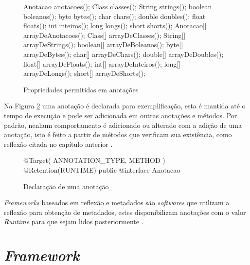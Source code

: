 \begin{figure}[H]
    \centering
    \caption{Propriedades permitidas em anotações}
    \begin{java}
Anotacao anotacoes();
Class classes();
String strings();
boolean boleanos();
byte bytes();
char chars();
double doubles();
float floats();
int inteiros();
long longs();	
short shorts();
Anotacao[] arrayDeAnotacoes();
Class[] arrayDeClasses();
String[] arrayDeStrings();
boolean[] arrayDeBoleanos();
byte[] arrayDeBytes();
char[] arrayDeChars();
double[] arrayDeDoubles();
float[] arrayDeFloats();
int[] arrayDeInteiros();
long[] arrayDeLongs();	
short[] arrayDeShorts();
    \end{java}
    \label{fig:propriedades-anotacoes}
\end{figure}

\par Na Figura \ref{fig:declaracao-anotacao} uma anotação é declarada para exemplificação, esta é mantida até o tempo de execução e pode ser adicionada em outras anotações e métodos. Por padrão, nenhum comportamento é adicionado ou alterado com a adição de uma anotação, isto é feito a partir de métodos que verificam sua existência, como reflexão citada no capítulo anterior \cite{bloch2004jsr}. 

\begin{figure}[H]
    \centering
    \caption{Declaração de uma anotação}
    \begin{java}
@Target({ ANNOTATION_TYPE, METHOD })
@Retention(RUNTIME)
public @interface Anotacao {
}
    \end{java}
    \label{fig:declaracao-anotacao}
\end{figure}

\textit{Frameworks} baseados em reflexão e metadados são \textit{softwares} que utilizam a reflexão para obtenção de metadados, estes disponibilizam anotações com o valor \textit{Runtime} para que sejam lidos posteriormente \cite{guerra2009pattern}.

\section{\textit{Framework}}


